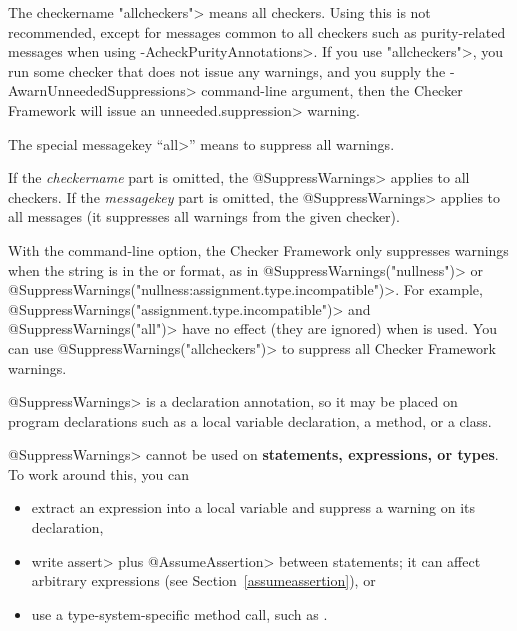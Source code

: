 The checkername \<"allcheckers"> means all checkers.  Using this is not
recommended, except for messages common to all checkers such as
purity-related messages when using \<-AcheckPurityAnnotations>.  If you use
\<"allcheckers">, you run some checker that does not issue any warnings,
and you supply the \<-AwarnUnneededSuppressions> command-line argument, then
the Checker Framework will issue an \<unneeded.suppression>
warning.

The special messagekey ``\<all>'' means to suppress all warnings.

If the \emph{checkername} part is omitted, the \<@SuppressWarnings> applies
to all checkers.
If the \emph{messagekey} part is omitted, the \<@SuppressWarnings> applies
to all messages (it suppresses all warnings from the given checker).

With the  command-line
option, the Checker Framework only suppresses warnings when the string is in
the  or 
format, as in
\<@SuppressWarnings("nullness")> or
\<@SuppressWarnings("nullness:assignment.type.incompatible")>.
For example, \<@SuppressWarnings("assignment.type.incompatible")> and
\<@SuppressWarnings("all")> have no effect (they are ignored) when
 is used.  You can use
\<@SuppressWarnings("allcheckers")> to suppress all Checker Framework
warnings.

%



\<@SuppressWarnings> is a declaration annotation, so it may be placed on
program declarations such as a local variable declaration, a method, or a
class.

\<@SuppressWarnings> cannot be used on \textbf{statements, expressions, or types}.
To work around this, you can
\begin{itemize}
\item
  extract an expression into a local variable
  and suppress a warning on its declaration,
\item
  write \<assert> plus \<@AssumeAssertion> between statements; it can
  affect arbitrary expressions (see Section~\ref{assumeassertion}), or
\item
  use a type-system-specific method call, such as
  .
\end{itemize}

